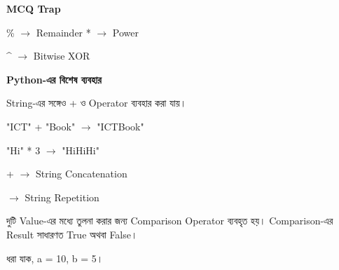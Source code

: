 \begin{rememberbox}

\textbf{\color{deepOrange}MCQ Trap}

\begin{center}

\textenglish{\ttfamily \%}
\(\longrightarrow\)
Remainder
\qquad
\textenglish{\ttfamily **}
\(\longrightarrow\)
Power

\qquad

\textenglish{\ttfamily \textasciicircum}
\(\longrightarrow\)
Bitwise XOR

\end{center}

\end{rememberbox}


\begin{rememberbox}

\textbf{\color{deepOrange}Python-এর বিশেষ ব্যবহার}

String-এর সঙ্গেও
\textenglish{\ttfamily +}
ও
\textenglish{\ttfamily *}
Operator ব্যবহার করা যায়।

\begin{center}

\textenglish{\ttfamily "ICT" + "Book"}
\(\longrightarrow\)
\textenglish{\ttfamily "ICTBook"}

\qquad

\textenglish{\ttfamily "Hi" * 3}
\(\longrightarrow\)
\textenglish{\ttfamily "HiHiHi"}

\end{center}

\textenglish{\ttfamily +}
\(\longrightarrow\)
String Concatenation

\qquad

\textenglish{\ttfamily *}
\(\longrightarrow\)
String Repetition

\end{rememberbox}



দুটি Value-এর মধ্যে তুলনা করার জন্য Comparison Operator
ব্যবহৃত হয়। Comparison-এর Result সাধারণত
\textenglish{\ttfamily True}
অথবা
\textenglish{\ttfamily False}।

ধরা যাক,
\textenglish{\ttfamily a = 10},
\textenglish{\ttfamily b = 5}।

